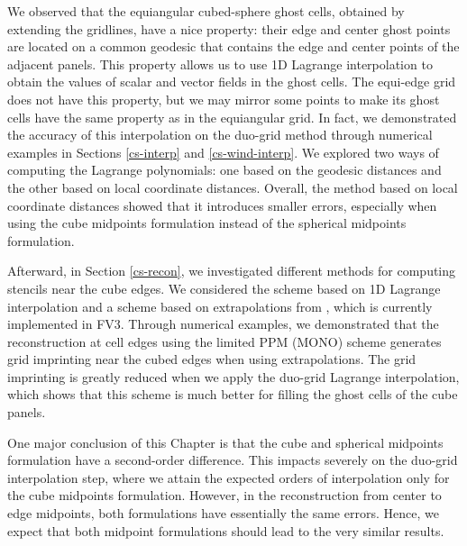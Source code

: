 We observed that the equiangular cubed-sphere ghost cells, obtained by extending the gridlines, have a nice property:
their edge and center ghost points are located on a common geodesic that contains the edge and center points of the adjacent panels. 
This property allows us to use 1D Lagrange interpolation to obtain the values of scalar and vector fields in the ghost cells.
The equi-edge grid does not have this property, but we may mirror some points to make its ghost cells have the same property as in the equiangular grid.
In fact, we demonstrated the accuracy of this interpolation on the duo-grid method through numerical examples in Sections \ref{cs-interp} and \ref{cs-wind-interp}.
We explored two ways of computing the Lagrange polynomials: one based on the geodesic distances and the other based on local coordinate distances.
Overall, the method based on local coordinate distances showed that it introduces smaller errors,
especially when using the cube midpoints formulation instead of the spherical midpoints formulation.

Afterward, in Section \ref{cs-recon}, we investigated different methods for computing stencils near the cube edges.
We considered the scheme based on 1D Lagrange interpolation and a scheme based on extrapolations from \citet{putman:2007}, which is currently implemented in FV3.
Through numerical examples, we demonstrated that the reconstruction at cell edges using the limited PPM (MONO) scheme generates grid imprinting near
the cubed edges when using extrapolations.
The grid imprinting is greatly reduced when we apply the duo-grid Lagrange interpolation, which shows that this scheme is much better for filling the ghost cells of the cube panels.

One major conclusion of this Chapter is that the cube and spherical midpoints formulation have a second-order difference.
This impacts severely on the duo-grid interpolation step, where we attain the expected orders of interpolation only for the cube midpoints formulation.
However, in the reconstruction from center to edge midpoints, both formulations have essentially the same errors.
Hence, we expect that both midpoint formulations should lead to the very similar results.


